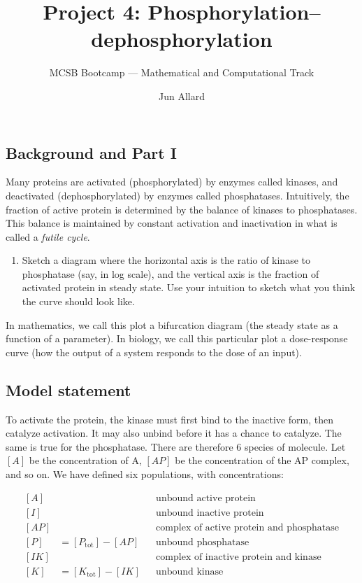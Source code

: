\documentclass[
  letterpaper,
  DIV=11,
  numbers=noendperiod]{scrartcl}
\title{Project 4: Phosphorylation--dephosphorylation}
\subtitle{MCSB Bootcamp --- Mathematical and Computational Track}
\author{Jun Allard}
\date{}
\providecommand{\tightlist}{%
  \setlength{\itemsep}{0pt}\setlength{\parskip}{0pt}}
\begin{document}
\maketitle


\subsection{Background and Part I}\label{background-and-part-i}

Many proteins are activated (phosphorylated) by enzymes called kinases,
and deactivated (dephosphorylated) by enzymes called phosphatases.
Intuitively, the fraction of active protein is determined by the balance
of kinases to phosphatases. This balance is maintained by constant
activation and inactivation in what is called a \emph{futile cycle}.

\begin{enumerate}
\def\labelenumi{\alph{enumi}.}
\tightlist
\item
  Sketch a diagram where the horizontal axis is the ratio of kinase to
  phosphatase (say, in log scale), and the vertical axis is the fraction
  of activated protein in steady state. Use your intuition to sketch
  what you think the curve should look like.
\end{enumerate}

In mathematics, we call this plot a bifurcation diagram (the steady
state as a function of a parameter). In biology, we call this particular
plot a dose-response curve (how the output of a system responds to the
dose of an input).

\subsection{Model statement}\label{model-statement}

To activate the protein, the kinase must first bind to the inactive
form, then catalyze activation. It may also unbind before it has a
chance to catalyze. The same is true for the phosphatase. There are
therefore 6 species of molecule. Let \([A]\) be the concentration of A,
\([AP]\) be the concentration of the AP complex, and so on. We have
defined six populations, with concentrations:

\[
\begin{aligned}
{}[A] &  & &\text{unbound active protein}\\
[I] &  & &\text{unbound inactive protein}\\
[AP] &  & &\text{complex of active protein and phosphatase}\\
[P] &= [P_\mathrm{tot}] - [AP] & &\text{unbound phosphatase}\\
[IK] &  & &\text{complex of inactive protein and kinase}\\
[K] &= [K_\mathrm{tot}] - [IK] & &\text{unbound kinase}
\end{aligned}
\]
\end{document}
